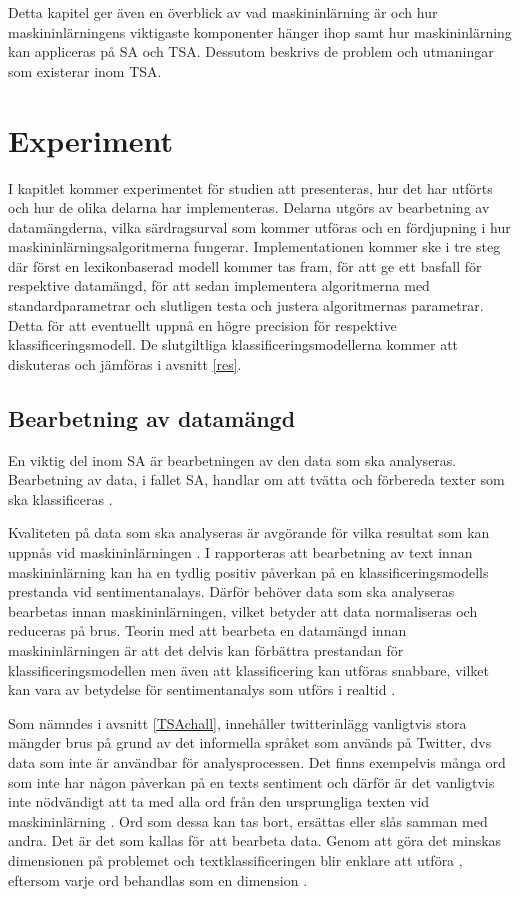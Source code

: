 \documentclass{kaumasters} %
\begin{document}
Detta kapitel ger även en överblick av vad maskininlärning är och hur maskininlärningens viktigaste komponenter hänger ihop samt hur maskininlärning kan appliceras på SA och TSA. Dessutom beskrivs de problem och utmaningar som existerar inom TSA. 

\chapter{Experiment}
I kapitlet kommer experimentet för studien att presenteras, hur det har utförts och hur de olika delarna har implementeras. Delarna utgörs av bearbetning av datamängderna, vilka särdragsurval som kommer utföras och en fördjupning i hur maskininlärningsalgoritmerna fungerar. Implementationen kommer ske i tre steg där först en lexikonbaserad modell kommer tas fram, för att ge ett basfall för respektive datamängd, för att sedan implementera algoritmerna med standardparametrar och slutligen testa och justera algoritmernas parametrar. Detta för att eventuellt uppnå en högre precision för respektive klassificeringsmodell. 
De slutgiltliga klassificeringsmodellerna kommer att diskuteras och jämföras i avsnitt \ref{res}.
\section{Bearbetning av datamängd} \label{exp:pre}
En viktig del inom SA är bearbetningen av den data som ska analyseras. Bearbetning av data, i fallet SA, handlar om att tvätta och förbereda texter som ska klassificeras \cite{effrosynidis2017comparison}. 

Kvaliteten på data som ska analyseras är avgörande för vilka resultat som kan uppnås vid maskininlärningen \cite{effrosynidis2017comparison}. I \cite{HADDI201326} rapporteras att bearbetning av text innan maskininlärning kan ha en tydlig positiv påverkan på en klassificeringsmodells prestanda vid sentimentanalays. Därför behöver data som ska analyseras bearbetas innan maskininlärningen, vilket betyder att data normaliseras och reduceras på brus. Teorin med att bearbeta en datamängd innan maskininlärningen är att det delvis kan förbättra prestandan för klassificeringsmodellen men även att  klassificering kan utföras snabbare, vilket kan vara av betydelse för sentimentanalys som utförs i realtid \cite{7862202}. 

Som nämndes i avsnitt \ref{TSAchall}, innehåller twitterinlägg vanligtvis stora mängder brus på grund av det informella språket som används på Twitter, dvs data som inte är användbar för analysprocessen. Det finns exempelvis många ord som inte har någon påverkan på en texts sentiment och därför är det vanligtvis inte nödvändigt att ta med alla ord från den ursprungliga texten vid maskininlärning \cite{effrosynidis2017comparison, HADDI201326}. Ord som dessa kan tas bort, ersättas eller slås samman med andra. Det är det som kallas för att bearbeta data. Genom att göra det minskas dimensionen på problemet och textklassificeringen blir enklare att utföra , eftersom varje ord behandlas som en dimension \cite{HADDI201326}. 
\end{document}
